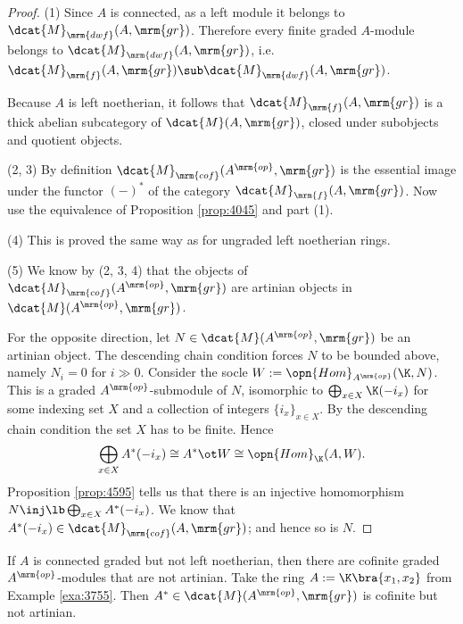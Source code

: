 \begin{proof} \mbox{}

\smallskip \noindent
(1) Since $A$ is connected, as a left module it belongs to 
$\dcat{M}_{\mrm{dwf}}(A, \mrm{gr})$. Therefore every finite graded $A$-module 
belongs to $\dcat{M}_{\mrm{dwf}}(A, \mrm{gr})$, i.e.\
$\dcat{M}_{\mrm{f}}(A, \mrm{gr}) \sub \dcat{M}_{\mrm{dwf}}(A, \mrm{gr})$.

Because $A$ is left noetherian, it follows that 
$\dcat{M}_{\mrm{f}}(A, \mrm{gr})$
is a thick abelian subcategory of
$\dcat{M}(A, \mrm{gr})$, 
closed under subobjects and quotient objects.

\medskip \noindent 
(2, 3) By definition 
$\dcat{M}_{\mrm{cof}}(A^{\mrm{op}}, \mrm{gr})$
is the essential image under the functor $(-)^*$ of the category
$\dcat{M}_{\mrm{f}}(A, \mrm{gr})$.
Now use the equivalence of Proposition \ref{prop:4045} and part (1). 

\medskip \noindent 
(4) This is proved the same way as for ungraded left noetherian rings. 

\medskip \noindent 
(5) We know by (2, 3, 4) that the objects of 
$\dcat{M}_{\mrm{cof}}(A^{\mrm{op}}, \mrm{gr})$
are artinian objects in 
$\dcat{M}(A^{\mrm{op}}, \mrm{gr})$.

For the opposite direction, let 
$N \in \dcat{M}(A^{\mrm{op}}, \mrm{gr})$ be an artinian object. 
The descending chain condition forces $N$ to be bounded above, namely 
$N_i = 0$ for $i \gg 0$. 
Consider the socle
$W := \opn{Hom}_{A^{\mrm{op}}}(\K, N)$. 
This is a graded $A^{\mrm{op}}$-submodule of $N$, isomorphic to 
$\bigoplus_{x \in X}  \K(-i_x)$ for some indexing set $X$ and a collection of 
integers $\{ i_x \}_{x \in X}$. By the descending chain condition the set $X$ 
has to be finite. Hence 
\[ \bigoplus_{x \in X}  A^*(-i_x) \cong A^* \ot W \cong 
\opn{Hom}_{\K}(A, W) . \]
Proposition \ref{prop:4595} tells us that there is an injective 
homomorphism 
$N \inj \lb \bigoplus_{x \in X} A^*(-i_x)$.
We know that $A^*(-i_x) \in \dcat{M}_{\mrm{cof}}(A, \mrm{gr})$; 
and hence so is $N$. 
\end{proof}

\begin{rem} \label{rem:3903}
If $A$ is connected graded but not left noetherian, then there are cofinite 
graded $A^{\mrm{op}}$-modules that are not artinian. Take the ring 
$A := \K \bra{x_1, x_2}$ from Example \ref{exa:3755}. Then 
$A^* \in \dcat{M}(A^{\mrm{op}}, \mrm{gr})$
is cofinite but not artinian. 
\end{rem}



